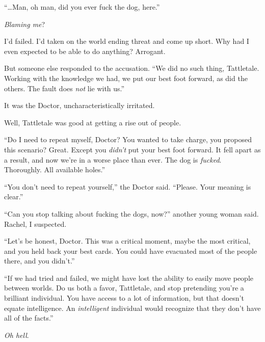 





``\ldots{}Man, oh man, did you ever fuck the dog, here.''



\emph{Blaming me}?



I'd failed.  I'd taken on the world ending threat and come up short.  Why had I even expected to be able to do anything?  Arrogant.



But someone else responded to the accusation.  ``We did no such thing, Tattletale.  Working with the knowledge we had, we put our best foot forward, as did the others.  The fault does \emph{not} lie with us.''



It was the Doctor, uncharacteristically irritated.



Well, Tattletale was good at getting a rise out of people.



``Do I need to repeat myself, Doctor?  You wanted to take charge, you proposed this scenario?  Great.  Except you \emph{didn't} put your best foot forward.  It fell apart as a result, and now we're in a worse place than ever.  The dog is \emph{fucked}.  Thoroughly.  All available holes.''



``You don't need to repeat yourself,'' the Doctor said.  ``Please.  Your meaning is clear.''



``Can you stop talking about fucking the dogs, now?'' another young woman said.  Rachel, I suspected.



``Let's be honest, Doctor.  This was a critical moment, maybe the most critical, and you held back your best cards.  You could have evacuated most of the people there, and you didn't.''



``If we had tried and failed, we might have lost the ability to easily move people between worlds.  Do us both a favor, Tattletale, and stop pretending you're a brilliant individual.  You have access to a lot of information, but that doesn't equate intelligence.  An \emph{intelligent} individual would recognize that they don't have all of the facts.''



\emph{Oh hell}.



